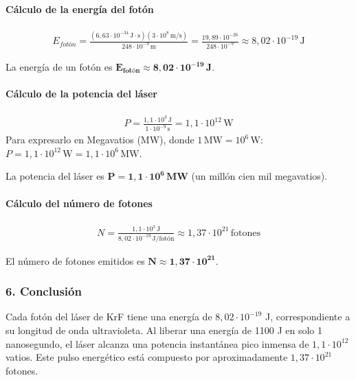 \paragraph*{Cálculo de la energía del fotón}
\begin{gather}
    E_{fotón} = \frac{(6,63\cdot10^{-34} \, \text{J}\cdot\text{s})(3\cdot10^{8} \, \text{m/s})}{248 \cdot 10^{-9} \, \text{m}} = \frac{19,89 \cdot 10^{-26}}{248 \cdot 10^{-9}} \approx 8,02 \cdot 10^{-19} \, \text{J}
\end{gather}
\begin{cajaresultado}
    La energía de un fotón es $\boldsymbol{E_{fotón} \approx 8,02 \cdot 10^{-19} \, \textbf{J}}$.
\end{cajaresultado}

\paragraph*{Cálculo de la potencia del láser}
\begin{gather}
    P = \frac{1,1 \cdot 10^{3} \, \text{J}}{1 \cdot 10^{-9} \, \text{s}} = 1,1 \cdot 10^{12} \, \text{W}
\end{gather}
Para expresarlo en Megavatios (MW), donde $1 \, \text{MW} = 10^6 \, \text{W}$:
$P = 1,1 \cdot 10^{12} \, \text{W} = 1,1 \cdot 10^{6} \, \text{MW}$.
\begin{cajaresultado}
    La potencia del láser es $\boldsymbol{P = 1,1 \cdot 10^{6} \, \textbf{MW}}$ (un millón cien mil megavatios).
\end{cajaresultado}

\paragraph*{Cálculo del número de fotones}
\begin{gather}
    N = \frac{1,1 \cdot 10^{3} \, \text{J}}{8,02 \cdot 10^{-19} \, \text{J/fotón}} \approx 1,37 \cdot 10^{21} \, \text{fotones}
\end{gather}
\begin{cajaresultado}
    El número de fotones emitidos es $\boldsymbol{N \approx 1,37 \cdot 10^{21}}$.
\end{cajaresultado}

\subsubsection*{6. Conclusión}
\begin{cajaconclusion}
    Cada fotón del láser de KrF tiene una energía de $8,02 \cdot 10^{-19}$ J, correspondiente a su longitud de onda ultravioleta. Al liberar una energía de 1100 J en solo 1 nanosegundo, el láser alcanza una potencia instantánea pico inmensa de $1,1 \cdot 10^{12}$ vatios. Este pulso energético está compuesto por aproximadamente $1,37 \cdot 10^{21}$ fotones.
\end{cajaconclusion}
\newpage
